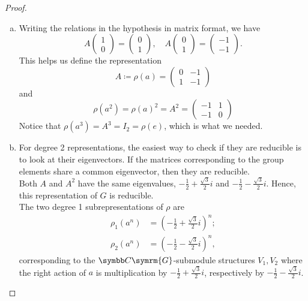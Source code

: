 \begin{proof}
~
\begin{enumerate}[a)]
    \item Writing the relations in the hypothesis in matrix format, we have
    \[
        A \begin{pmatrix}
            1 \\ 0
        \end{pmatrix} =
        \begin{pmatrix}
            0 \\ 1
        \end{pmatrix},
        \quad
        A \begin{pmatrix}
            0 \\ 1
        \end{pmatrix} =
        \begin{pmatrix}
            -1 \\ -1
        \end{pmatrix}.
    \]
    This helps us define the representation
    \[
        A \coloneqq \rho(a) = \begin{pmatrix}
            0 & -1 \\
            1 & -1
        \end{pmatrix}
    \]
    and
    \[
        \rho(a^2) = \rho(a)^2 = A^2 = \begin{pmatrix}
            -1 & 1 \\
            -1 & 0
        \end{pmatrix}
    \]
    Notice that \(\rho(a^3) = A^3 = I_2 = \rho(e)\), which is what we needed.
    
    \item For degree 2 representations, the easiest way to check if they are reducible is to look at their eigenvectors. If the matrices corresponding to the group elements share a common eigenvector, then they are reducible. \\[1ex]
    Both \(A\) and \(A^2\) have the same eigenvalues, \(- \frac{1}{2} + \frac{\sqrt{3}}{2} i\) and \(- \frac{1}{2} - \frac{\sqrt{3}}{2} i\). Hence, this representation of \(G\) is reducible. \\[1ex]
    The two degree 1 subrepresentations of \(\rho\) are
    \begin{align*}
        \rho_1(a^n) &= \left(- \frac{1}{2} + \frac{\sqrt{3}}{2} i\right)^n; \\
        \rho_2(a^n) &= \left(- \frac{1}{2} - \frac{\sqrt{3}}{2} i\right)^n,
    \end{align*}
    corresponding to the \(\complex \symrm{G}\)-submodule structures \(V_1, V_2\) where the right action of \(a\) is multiplication by \(- \frac{1}{2} + \frac{\sqrt{3}}{2} i\), respectively by \(- \frac{1}{2} - \frac{\sqrt{3}}{2} i\).
\end{enumerate}
\end{proof}

